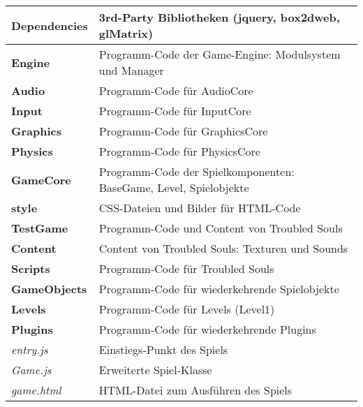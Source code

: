 \begin{tabular}{|l|p{}|}
\hline 
\textbf{Dependencies} & 3rd-Party Bibliotheken (jquery, box2dweb, glMatrix) \\ 
\hline 
\textbf{Engine} & Programm-Code der Game-Engine: Modulsystem und Manager \\ 
\hline 
\hspace{0.5cm} \textbf{Audio} & Programm-Code für AudioCore \\ 
\hline 
\hspace{0.5cm} \textbf{Input} & Programm-Code für InputCore \\ 
\hline 
\hspace{0.5cm} \textbf{Graphics} & Programm-Code für GraphicsCore \\ 
\hline 
\hspace{0.5cm} \textbf{Physics} & Programm-Code für PhysicsCore \\ 
\hline 
\textbf{GameCore} & Programm-Code der Spielkomponenten: BaseGame, Level, Spielobjekte \\ 
\hline 
\textbf{style} & CSS-Dateien und Bilder für HTML-Code \\ 
\hline
\textbf{TestGame} & Programm-Code und Content von Troubled Souls \\
\hline 
\hspace{0.5cm} \textbf{Content} & Content von Troubled Souls: Texturen und Sounds \\ 
\hline 
\hspace{0.5cm} \textbf{Scripts} & Programm-Code für Troubled Souls \\ 
\hline 
\hspace{1cm} \textbf{GameObjects} & Programm-Code für wiederkehrende Spielobjekte \\
\hline 
\hspace{1cm} \textbf{Levels} & Programm-Code für Levels (Level1) \\ 
\hline 
\hspace{1cm} \textbf{Plugins} & Programm-Code für wiederkehrende Plugins \\  
\hline 
\hspace{1cm} \textit{entry.js} & Einstiegs-Punkt des Spiels \\ 
\hline 
\hspace{1cm} \textit{Game.js} & Erweiterte Spiel-Klasse \\ 
\hline 
\textit{game.html} & HTML-Datei zum Ausführen des Spiels \\ 
\hline 

\hline 
\end{tabular}